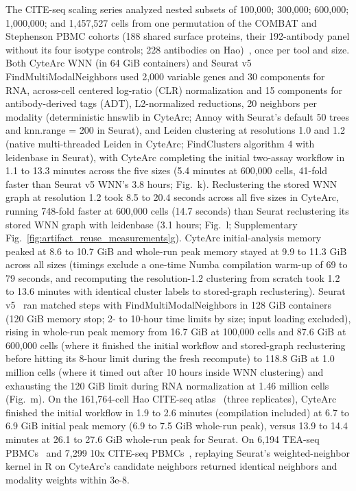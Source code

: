 The CITE-seq scaling series analyzed nested subsets of 100,000; 300,000; 600,000; 1,000,000; and 1,457,527 cells from one permutation of the COMBAT and Stephenson PBMC cohorts (188 shared surface proteins, their 192-antibody panel without its four isotype controls; 228 antibodies on Hao)~\cite{combat2022blood,stephenson2021singlecell}, once per tool and size. Both CyteArc WNN (in 64 GiB containers) and Seurat v5 FindMultiModalNeighbors used 2,000 variable genes and 30 components for RNA, across-cell centered log-ratio (CLR) normalization and 15 components for antibody-derived tags (ADT), L2-normalized reductions, 20 neighbors per modality (deterministic hnswlib in CyteArc; Annoy with Seurat's default 50 trees and knn.range = 200 in Seurat), and Leiden clustering at resolutions 1.0 and 1.2 (native multi-threaded Leiden in CyteArc; FindClusters algorithm 4 with leidenbase in Seurat), with CyteArc completing the initial two-assay workflow in 1.1 to 13.3 minutes across the five sizes (5.4 minutes at 600,000 cells, 41-fold faster than Seurat v5 WNN's 3.8 hours; Fig.~k). Reclustering the stored WNN graph at resolution 1.2 took 8.5 to 20.4 seconds across all five sizes in CyteArc, running 748-fold faster at 600,000 cells (14.7 seconds) than Seurat reclustering its stored WNN graph with leidenbase (3.1 hours; Fig.~l; Supplementary Fig.~\ref{fig:artifact_reuse_measurements}g). CyteArc initial-analysis memory peaked at 8.6 to 10.7 GiB and whole-run peak memory stayed at 9.9 to 11.3 GiB across all sizes (timings exclude a one-time Numba compilation warm-up of 69 to 79 seconds, and recomputing the resolution-1.2 clustering from scratch took 1.2 to 13.6 minutes with identical cluster labels to stored-graph reclustering). Seurat v5~\cite{hao2024seurat} ran matched steps with FindMultiModalNeighbors in 128 GiB containers (120 GiB memory stop; 2- to 10-hour time limits by size; input loading excluded), rising in whole-run peak memory from 16.7 GiB at 100,000 cells and 87.6 GiB at 600,000 cells (where it finished the initial workflow and stored-graph reclustering before hitting its 8-hour limit during the fresh recompute) to 118.8 GiB at 1.0 million cells (where it timed out after 10 hours inside WNN clustering) and exhausting the 120 GiB limit during RNA normalization at 1.46 million cells (Fig.~m). On the 161,764-cell Hao CITE-seq atlas~\cite{hao2021} (three replicates), CyteArc finished the initial workflow in 1.9 to 2.6 minutes (compilation included) at 6.7 to 6.9 GiB initial peak memory (6.9 to 7.5 GiB whole-run peak), versus 13.9 to 14.4 minutes at 26.1 to 27.6 GiB whole-run peak for Seurat. On 6,194 TEA-seq PBMCs~\cite{swanson2021} and 7,299 10x CITE-seq PBMCs~\cite{tenx2018pbmc10kprotein}, replaying Seurat's weighted-neighbor kernel in R on CyteArc's candidate neighbors returned identical neighbors and modality weights within 3e-8.


